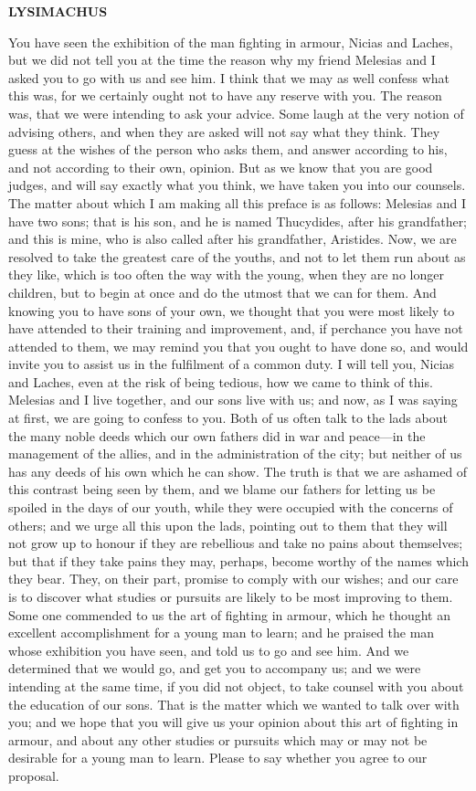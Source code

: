 \documentclass[11pt,letter]{article}
\begin{document}
\par \textbf{LYSIMACHUS}
\par   You have seen the exhibition of the man fighting in armour, Nicias and Laches, but we did not tell you at the time the reason why my friend Melesias and I asked you to go with us and see him. I think that we may as well confess what this was, for we certainly ought not to have any reserve with you. The reason was, that we were intending to ask your advice. Some laugh at the very notion of advising others, and when they are asked will not say what they think. They guess at the wishes of the person who asks them, and answer according to his, and not according to their own, opinion. But as we know that you are good judges, and will say exactly what you think, we have taken you into our counsels. The matter about which I am making all this preface is as follows:  Melesias and I have two sons; that is his son, and he is named Thucydides, after his grandfather; and this is mine, who is also called after his grandfather, Aristides. Now, we are resolved to take the greatest care of the youths, and not to let them run about as they like, which is too often the way with the young, when they are no longer children, but to begin at once and do the utmost that we can for them. And knowing you to have sons of your own, we thought that you were most likely to have attended to their training and improvement, and, if perchance you have not attended to them, we may remind you that you ought to have done so, and would invite you to assist us in the fulfilment of a common duty. I will tell you, Nicias and Laches, even at the risk of being tedious, how we came to think of this. Melesias and I live together, and our sons live with us; and now, as I was saying at first, we are going to confess to you. Both of us often talk to the lads about the many noble deeds which our own fathers did in war and peace—in the management of the allies, and in the administration of the city; but neither of us has any deeds of his own which he can show. The truth is that we are ashamed of this contrast being seen by them, and we blame our fathers for letting us be spoiled in the days of our youth, while they were occupied with the concerns of others; and we urge all this upon the lads, pointing out to them that they will not grow up to honour if they are rebellious and take no pains about themselves; but that if they take pains they may, perhaps, become worthy of the names which they bear. They, on their part, promise to comply with our wishes; and our care is to discover what studies or pursuits are likely to be most improving to them. Some one commended to us the art of fighting in armour, which he thought an excellent accomplishment for a young man to learn; and he praised the man whose exhibition you have seen, and told us to go and see him. And we determined that we would go, and get you to accompany us; and we were intending at the same time, if you did not object, to take counsel with you about the education of our sons. That is the matter which we wanted to talk over with you; and we hope that you will give us your opinion about this art of fighting in armour, and about any other studies or pursuits which may or may not be desirable for a young man to learn. Please to say whether you agree to our proposal.
\end{document}
